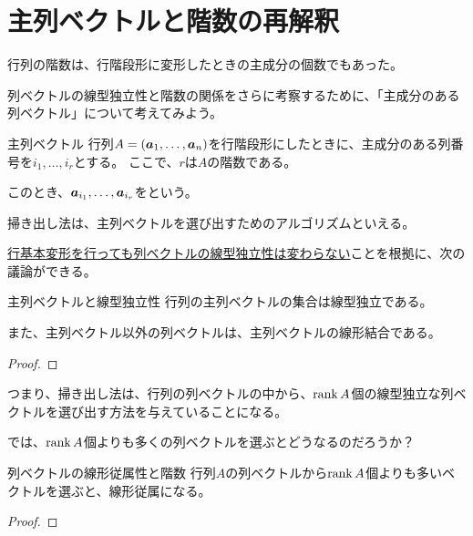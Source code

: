 \documentclass[../../../topic_linear-algebra]{subfiles}
\begin{document}
\sectionline
\section{主列ベクトルと階数の再解釈}

行列の階数は、行階段形に変形したときの主成分の個数でもあった。

列ベクトルの線型独立性と階数の関係をさらに考察するために、「主成分のある列ベクトル」について考えてみよう。

\begin{definition}{主列ベクトル}\label{def:pivot-columns}
  行列$A = (\vb*{a}_1, \dots, \vb*{a}_n)$を行階段形にしたときに、主成分のある列番号を$i_1,\dots, i_r$とする。
  ここで、$r$は$A$の階数である。

  このとき、$\vb*{a}_{i_1}, \dots, \vb*{a}_{i_r}$をという。
\end{definition}

掃き出し法は、主列ベクトルを選び出すためのアルゴリズムといえる。

\br

\hyperref[thm:row-operation-preserves-dependence]{行基本変形を行っても列ベクトルの線型独立性は変わらない}ことを根拠に、次の議論ができる。

\begin{theorem}{主列ベクトルと線型独立性}
  行列の主列ベクトルの集合は線型独立である。

  また、主列ベクトル以外の列ベクトルは、主列ベクトルの線形結合である。
\end{theorem}

\begin{proof}
\end{proof}

\br

つまり、掃き出し法は、行列の列ベクトルの中から、$\rank A$個の線型独立な列ベクトルを選び出す方法を与えていることになる。

\br

では、$\rank A$個よりも多くの列ベクトルを選ぶとどうなるのだろうか？

\begin{theorem}{列ベクトルの線形従属性と階数}
  行列$A$の列ベクトルから$\rank A$個よりも多いベクトルを選ぶと、線形従属になる。
\end{theorem}

\begin{proof}
\end{proof}
\end{document}
